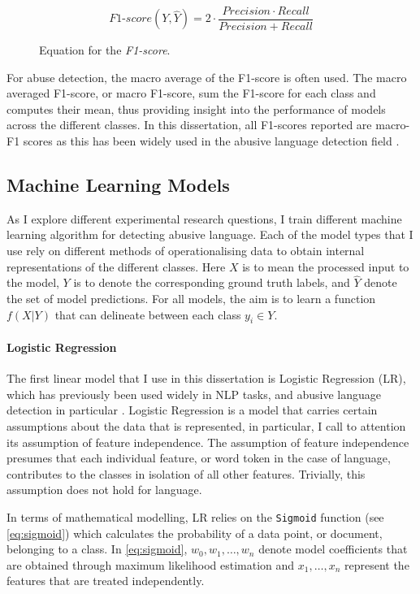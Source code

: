 \begin{figure}[h]
  \begin{equation}\label{eq:f1score}
    \mathit{F1}\text{-}score(Y,\hat{Y}) = 2\cdot\frac{Precision \cdot Recall}{Precision + Recall}
  \end{equation}
  \caption{Equation for the \textit{F1-score}.}
\end{figure}

For abuse detection, the macro average of the F1-score is often used. The macro averaged F1-score, or macro F1-score, sum the F1-score for each class and computes their mean, thus providing insight into the performance of models across the different classes.
In this dissertation, all F1-scores reported are macro-F1 scores as this has been widely used in the abusive language detection field \citep{Macro F1 score papers}.

\subsection{Machine Learning Models}

As I explore different experimental research questions, I train different machine learning algorithm for detecting abusive language. Each of the model types that I use rely on different methods of operationalising data to obtain internal representations of the different classes. Here $X$ is to mean the processed input to the model, $Y$ is to denote the corresponding ground truth labels, and $\hat{Y}$ denote the set of model predictions. For all models, the aim is to learn a function $f(X|Y)$ that can delineate between each class $y_i\in Y$.

\paragraph{Logistic Regression}
The first linear model that I use in this dissertation is Logistic Regression (LR), which has previously been used widely in NLP tasks, and abusive language detection in particular \citep{LR papers}. Logistic Regression is a model that carries certain assumptions about the data that is represented, in particular, I call to attention its assumption of feature independence. The assumption of feature independence presumes that each individual feature, or word token in the case of language, contributes to the classes in isolation of all other features. Trivially, this assumption does not hold for language.

In terms of mathematical modelling, LR relies on the \texttt{Sigmoid} function (see \autoref{eq:sigmoid}) which calculates the probability of a data point, or document, belonging to a class. In \autoref{eq:sigmoid}, $w_0, w_1, \ldots, w_n$ denote model coefficients that are obtained through maximum likelihood estimation and $x_1, \ldots, x_n$ represent the features that are treated independently.

